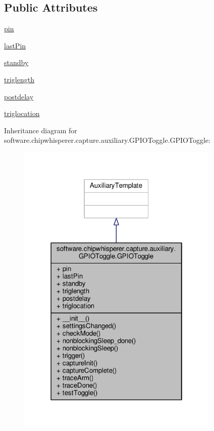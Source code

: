 \subsection*{Public Attributes}
\begin{DoxyCompactItemize}
\item 
\hyperlink{classsoftware_1_1chipwhisperer_1_1capture_1_1auxiliary_1_1GPIOToggle_1_1GPIOToggle_a10d8d62ca74fa399234614393232ee5b}{pin}
\item 
\hyperlink{classsoftware_1_1chipwhisperer_1_1capture_1_1auxiliary_1_1GPIOToggle_1_1GPIOToggle_a155ed7fa16ffb1a2e785c525bc6c7bb6}{last\+Pin}
\item 
\hyperlink{classsoftware_1_1chipwhisperer_1_1capture_1_1auxiliary_1_1GPIOToggle_1_1GPIOToggle_ad58381ef2e48b369bff61053f776b5e8}{standby}
\item 
\hyperlink{classsoftware_1_1chipwhisperer_1_1capture_1_1auxiliary_1_1GPIOToggle_1_1GPIOToggle_a098d7e971c52505b9c4bfade15a3848d}{triglength}
\item 
\hyperlink{classsoftware_1_1chipwhisperer_1_1capture_1_1auxiliary_1_1GPIOToggle_1_1GPIOToggle_a80f203bfead39692522d7f5f5643d57a}{postdelay}
\item 
\hyperlink{classsoftware_1_1chipwhisperer_1_1capture_1_1auxiliary_1_1GPIOToggle_1_1GPIOToggle_a123513b84fbc63e9e9effd97a5f1dfeb}{triglocation}
\end{DoxyCompactItemize}


Inheritance diagram for software.\+chipwhisperer.\+capture.\+auxiliary.\+G\+P\+I\+O\+Toggle.\+G\+P\+I\+O\+Toggle\+:\nopagebreak
\begin{figure}[H]
\begin{center}
\leavevmode
\includegraphics[width=274pt]{d3/d35/classsoftware_1_1chipwhisperer_1_1capture_1_1auxiliary_1_1GPIOToggle_1_1GPIOToggle__inherit__graph}
\end{center}
\end{figure}


